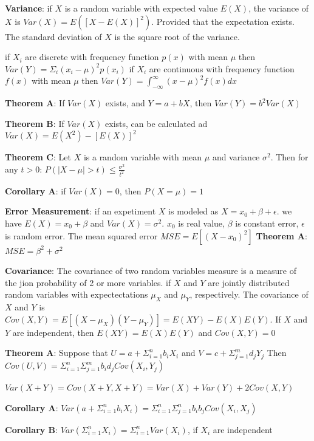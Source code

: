 \documentclass{article}
\begin{document}
\begin{multicols*}{2}
    \textbf{Variance}: if $X$ is a random variable with expected value $E(X)$, the variance of $X$ is
    $Var(X) = E \left( \left[ X - E(X) \right]^2 \right)$.
    Provided that the expectation exists. The standard deviation of $X$ is the square root of the variance.

    if $X_i$ are discrete with frequency function $p(x)$ with mean $\mu$ then $Var(Y) = \Sigma_i \left( x_i - \mu \right)^2 p(x_i)$
    if $X_i$ are continuous with frequency function $f(x)$ with mean $\mu$ then $Var(Y) = \int_{-\infty}^\infty \left( x-\mu \right)^2 f(x) dx$

    \textbf{Theorem A}: If $Var(X)$ exists, and $Y=a + bX$, then $Var(Y) = b^2 Var(X)$

    \textbf{Theorem B}: If $Var(X)$ exists, can be calculated ad $Var(X) = E(X^2) - \left[E(X)\right]^2$

    \textbf{Theorem C}: Let $X$ is a random variable with mean $\mu$ and variance $\sigma^2$. Then for any $t>0$:
    $P(|X-\mu| > t) \leq \frac{\sigma^2}{t^2}$

    \textbf{Corollary A}: if $Var(X) = 0$, then $P(X=\mu) = 1$

    \textbf{Error Measurement}: if an expetiment $X$ is modeled as $X = x_0 + \beta + \epsilon$.
    we have $E(X) = x_0 + \beta$ and $Var(X) = \sigma^2$. $x_0$ is real value, $\beta$ is constant error, $\epsilon$ is random error.
    The mean squared error $MSE = E\left[ \left( X - x_0\right)^2 \right]$
    \textbf{Theorem A}: $MSE = \beta^2 + \sigma^2$

    \textbf{Covariance}:
    The covariance of two random variables measure is a measure of the jion probability of 2 or more variables.
    if $X$ and $Y$ are jointly distributed random variables with expectectations $\mu_X$ and $\mu_Y$, respectively.
    The covariance of $X$ and $Y$ is $Cov(X, Y) = E\left[ (X-\mu_X) (Y-\mu_Y) \right] = E(XY) - E(X)E(Y)$.
    If $X$ and $Y$ are independent, then $E(XY) = E(X)E(Y)$ and $Cov(X, Y)=0$

    \textbf{Theorem A}: Suppose that $U = a + \Sigma_{i=1}^n b_i X_i$ and $V = c + \Sigma_{j=1}^m d_j Y_j$
    Then $Cov(U, V) = \Sigma_{i=1}^n \Sigma_{j=1}^m b_i d_j Cov(X_i, Y_j)$

    $Var(X + Y) = Cov(X+Y, X+Y) = Var(X) + Var(Y) + 2Cov(X, Y)$

    \textbf{Corollary A}: $Var(a + \Sigma_{i=1}^n b_i X_i) = \Sigma_{i=1}^n \Sigma_{j=1}^n b_i b_j Cov(X_i, X_j)$

    \textbf{Corollary B}: $Var(\Sigma_{i=1}^n X_i) = \Sigma_{i=1}^n Var(X_i)$, if $X_i$ are independent


\end{multicols*}
\end{document}
